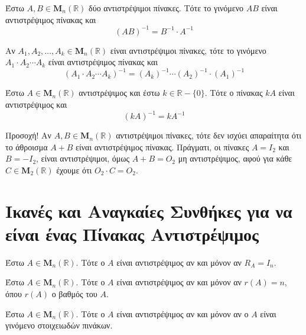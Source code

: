 \begin{prop}
  Έστω $ A, B \in \textbf{M}_{n}(\mathbb{R}) $ δύο αντιστρέψιμοι πίνακες. Τότε το 
  γινόμενο $ AB $ είναι αντιστρέψιμος πίνακας και 
  \[ 
    (AB)^{-1}=B^{-1}\cdot A^{-1} 
  \]
\end{prop}

\begin{cor}
  Αν $ A_{1}, A_{2}, \ldots, A_{k} \in \textbf{M}_{n}(\mathbb{R}) $ είναι 
  αντιστρέψιμοι πίνακες, τότε το γινόμενο $ A_{1}\cdot A_{2}\cdots A_{k} $ είναι 
  αντιστρέψιμος πίνακας και 
  \[
    (A_{1}\cdot A_{2}\cdots A_{k})^{-1} = (A_{k})^{-1}\cdots (A_{2})^{-1}\cdot (A_{1})^{-1}
  \] 
\end{cor}

\begin{prop}
  Έστω $ A \in \textbf{M}_{n}(\mathbb{R}) $ αντιστρέψιμος και έστω $ k \in \mathbb{R}- \{
  0 \}$. Τότε ο πίνακας $ kA $ είναι αντιστρέψιμος και 
  \[
    (kA)^{-1} = k A^{-1} 
  \] 
\end{prop}

\begin{rem}
  Προσοχή! Αν $ A, B \in \textbf{M}_{n}(\mathbb{R}) $ αντιστρέψιμοι πίνακες, τότε 
  δεν ισχύει απαραίτητα ότι το άθροισμα $ A+B $ είναι αντιστρέψιμος πίνακας. Πράγματι, 
  οι πίνακες $ A=I_{2} $ και $ B=-I_{2} $, είναι αντιστρέψιμοι, όμως $ A+B= O_{2} $ μη 
  αντιστρέψιμος, αφού για κάθε $ C \in \textbf{M}_{2}(\mathbb{R}) $ έχουμε ότι 
  $ O_{2}\cdot C=O_{2} $.
\end{rem}

\section*{Ικανές και Αναγκαίες Συνθήκες για να είναι ένας Πίνακας Αντιστρέψιμος}

\begin{thm}
  Έστω $ A \in \textbf{M}_{n}(\mathbb{R}) $. Τότε ο $A$ είναι αντιστρέψιμος αν και 
  μόνον αν $ R_{A}=I_{n} $.
\end{thm}

\begin{cor}
  Έστω $ A \in \textbf{M}_{n}(\mathbb{R}) $. Τότε ο $A$ είναι αντιστρέψιμος αν και 
  μόνον αν $ r(A)=n $, όπου $ r(A) $ ο βαθμός του $A$.
\end{cor}

\begin{thm}
  Έστω $ A \in \textbf{M}_{n}(\mathbb{R}) $. Τότε ο $A$ είναι αντιστρέψιμος αν και 
  μόνον αν ο $A$ είναι γινόμενο στοιχειωδών πινάκων.
\end{thm}

